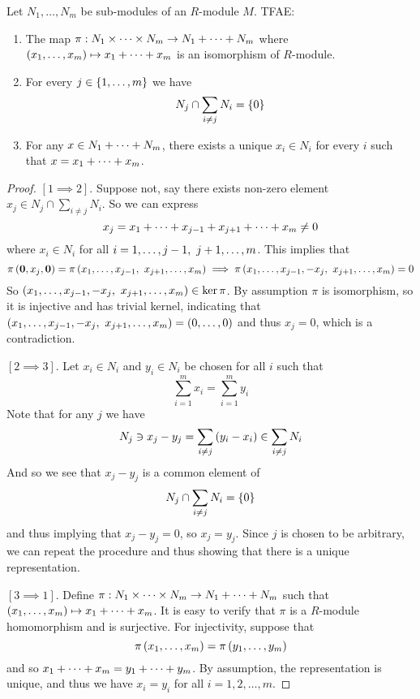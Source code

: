 \begin{pro} \label{pro: indi sum}
    Let $N_1, \dots, N_m$ be sub-modules of an $R$-module $M$. TFAE:
    \begin{enumerate}
        \item The map $\pi:N_1 \times \dots \times N_m \to N_1 +\dots+ N_m$ where $\left(x_1, \dots, x_m\right)\mapsto x_1 +\dots+ x_m$ is an isomorphism of $R$-module.
        \item For every $j\in \left\{1,\dots, m\right\}$ we have 
        \[N_j \cap \sum_{i\neq j}N_i = \left\{0\right\}\]
        \item For any $x\in N_1+\dots+ N_m$, there exists a unique $x_i\in N_i$ for every $i$ such that $x=x_1 +\dots+ x_m$.
    \end{enumerate}
\end{pro}
\begin{proof}
    $[1\implies 2]$. Suppose not, say there exists non-zero element $x_j\in N_j \cap \sum_{i\neq j}N_i$. So we can express 
    \[x_j=x_1 +\dots+ x_{j-1}+x_{j+1}+\dots+ x_m \neq 0\]
    where $x_i\in N_i$ for all $i=1,\dots, j-1,\ j+1,\dots, m$. This implies that 
    \[\pi\left(\mathbf{0}, x_j, \mathbf{0}\right) = \pi\left(x_1 ,\dots, x_{j-1},\ x_{j+1},\dots, x_m\right)\implies \pi\left(x_1 ,\dots, x_{j-1}, -x_j,\ x_{j+1},\dots, x_m\right)=0\]
    So $\left(x_1 ,\dots, x_{j-1}, -x_j,\ x_{j+1},\dots, x_m\right)\in \ker \pi$. By assumption $\pi$ is isomorphism, so it is injective and has trivial kernel, indicating that $\br{x_1 \many x_{j-1}, -x_j,\ x_{j+1}\many x_m}=(0\many 0)$ and thus $x_j=0$, which is a contradiction.

    $[2\implies 3]$. Let $x_i\in N_i$ and $y_i\in N_i$ be chosen for all $i$ such that
    \[\sum_{i=1}^m x_i = \sum_{i=1}^m y_i\]
    Note that for any $j$ we have
    \[N_j \ni x_j - y_j = \sum_{i\neq j}\left(y_i-x_i\right)\in \sum_{i\neq j}N_i\]
    And so we see that $x_j-y_j$ is a common element of 
    \[N_j \cap \sum_{i\neq j}N_i = \left\{0\right\}\]
    and thus implying that $x_j-y_j = 0$, so $x_j = y_j$. Since $j$ is chosen to be arbitrary, we can repeat the procedure and thus showing that there is a unique representation.

    $[3 \implies 1]$. Define $\pi: N_1 \times \dots \times N_m\to N_1 +\dots+ N_m$ such that $\left(x_1, \dots, x_m\right)\mapsto x_1 +\dots+ x_m$. It is easy to verify that $\pi$ is a $R$-module homomorphism and is surjective. For injectivity, suppose that 
    \[\pi\left(x_1, \dots, x_m\right)=\pi\left(y_1, \dots, y_m\right)\]
    and so $x_1+\dots+ x_m = y_1 +\dots+ y_m$. By assumption, the representation is unique, and thus we have $x_i = y_i$ for all $i=1, 2, \dots, m$. 
\end{proof}

